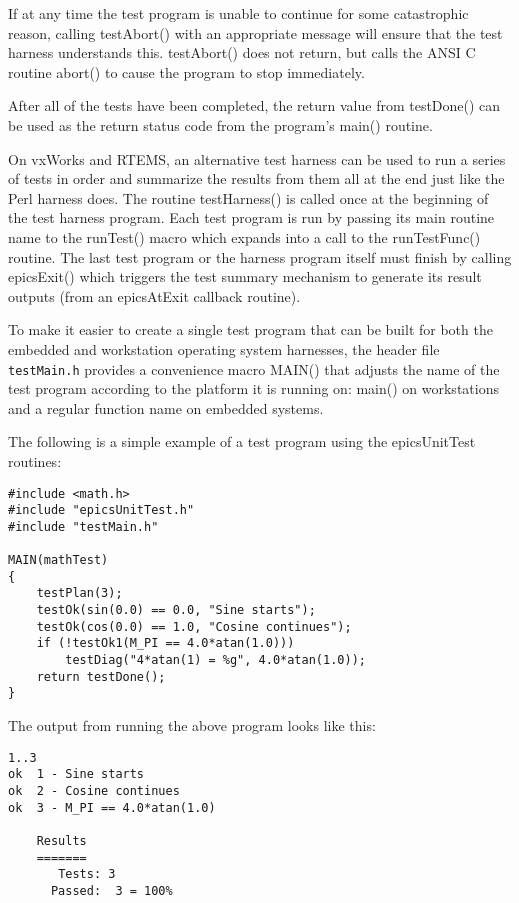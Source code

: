 If at any time the test program is unable to continue for some catastrophic reason, calling testAbort() with an appropriate message will ensure that the test harness understands this. testAbort() does not return, but calls the ANSI C routine abort() to cause the program to stop immediately.

After all of the tests have been completed, the return value from testDone() can be used as the return status code from the program's main() routine.

On vxWorks and RTEMS, an alternative test harness can be used to run a series of tests in order and summarize the results from them all at the end just like the Perl harness does.
The routine testHarness() is called once at the beginning of the test harness program.
Each test program is run by passing its main routine name to the runTest() macro which expands into a 
call to the runTestFunc() routine.
The last test program or the harness program itself must finish by calling epicsExit() which triggers the test summary mechanism to generate its result outputs (from an epicsAtExit callback routine).

To make it easier to create a single test program that can be built for both the embedded and workstation operating system harnesses, the header file \verb|testMain.h| provides a convenience macro MAIN() that adjusts the name of the test program according to the platform it is running on: main() on workstations and a regular function name on embedded systems.

The following is a simple example of a test program using the epicsUnitTest routines:

\begin{verbatim}
#include <math.h>
#include "epicsUnitTest.h"
#include "testMain.h"

MAIN(mathTest)
{
    testPlan(3);
    testOk(sin(0.0) == 0.0, "Sine starts");
    testOk(cos(0.0) == 1.0, "Cosine continues");
    if (!testOk1(M_PI == 4.0*atan(1.0)))
        testDiag("4*atan(1) = %g", 4.0*atan(1.0));
    return testDone();
}
\end{verbatim}

The output from running the above program looks like this:

\begin{verbatim}
1..3
ok  1 - Sine starts
ok  2 - Cosine continues
ok  3 - M_PI == 4.0*atan(1.0)

    Results
    =======
       Tests: 3
      Passed:  3 = 100%

\end{verbatim}
